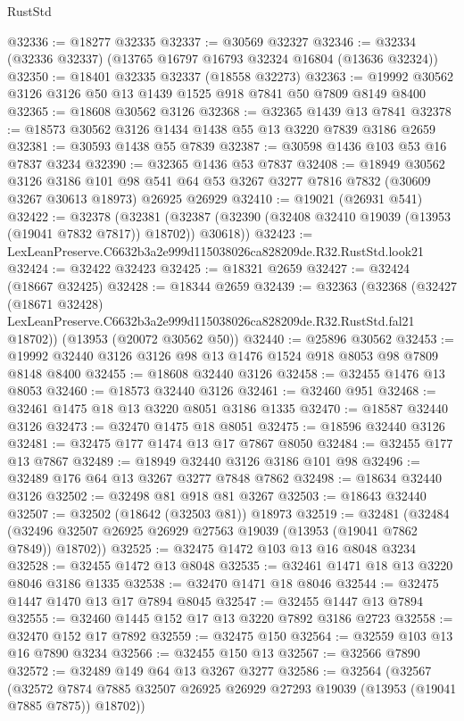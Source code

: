 \begin{lexlean}{RustStd}
\begin{coremodule}
@32336 := @18277 @32335
@32337 := @30569 @32327
@32346 := @32334 (@32336 @32337) (@13765 @16797 @16793 @32324 @16804 (@13636 @32324))
@32350 := @18401 @32335 @32337 (@18558 @32273)
@32363 := @19992 @30562 @3126 @3126 @50 @13 @1439 @1525 @918 @7841 @50 @7809 @8149 @8400
@32365 := @18608 @30562 @3126
@32368 := @32365 @1439 @13 @7841
@32378 := @18573 @30562 @3126 @1434 @1438 @55 @13 @3220 @7839 @3186 @2659
@32381 := @30593 @1438 @55 @7839
@32387 := @30598 @1436 @103 @53 @16 @7837 @3234
@32390 := @32365 @1436 @53 @7837
@32408 := @18949
    @30562
    @3126
    @3186
    @101
    @98
    @541
    @64
    @53
    @3267
    @3277
    @7816
    @7832
    (@30609 @3267 @30613 @18973)
    @26925
    @26929
@32410 := @19021 (@26931 @541)
@32422 := @32378
    (@32381 (@32387 (@32390 (@32408 @32410 @19039 (@13953 (@19041 @7832 @7817)) @18702)) @30618))
@32423 := LexLeanPreserve.C6632b3a2e999d115038026ca828209de.R32.RustStd.look21
@32424 := @32422 @32423
@32425 := @18321 @2659
@32427 := @32424 (@18667 @32425)
@32428 := @18344 @2659
@32439 := @32363
    (@32368
      (@32427
        (@18671 @32428)
        LexLeanPreserve.C6632b3a2e999d115038026ca828209de.R32.RustStd.fal21
        @18702))
    (@13953 (@20072 @30562 @50))
@32440 := @25896 @30562
@32453 := @19992 @32440 @3126 @3126 @98 @13 @1476 @1524 @918 @8053 @98 @7809 @8148 @8400
@32455 := @18608 @32440 @3126
@32458 := @32455 @1476 @13 @8053
@32460 := @18573 @32440 @3126
@32461 := @32460 @951
@32468 := @32461 @1475 @18 @13 @3220 @8051 @3186 @1335
@32470 := @18587 @32440 @3126
@32473 := @32470 @1475 @18 @8051
@32475 := @18596 @32440 @3126
@32481 := @32475 @177 @1474 @13 @17 @7867 @8050
@32484 := @32455 @177 @13 @7867
@32489 := @18949 @32440 @3126 @3186 @101 @98
@32496 := @32489 @176 @64 @13 @3267 @3277 @7848 @7862
@32498 := @18634 @32440 @3126
@32502 := @32498 @81 @918 @81 @3267
@32503 := @18643 @32440
@32507 := @32502 (@18642 (@32503 @81)) @18973
@32519 := @32481
    (@32484 (@32496 @32507 @26925 @26929 @27563 @19039 (@13953 (@19041 @7862 @7849)) @18702))
@32525 := @32475 @1472 @103 @13 @16 @8048 @3234
@32528 := @32455 @1472 @13 @8048
@32535 := @32461 @1471 @18 @13 @3220 @8046 @3186 @1335
@32538 := @32470 @1471 @18 @8046
@32544 := @32475 @1447 @1470 @13 @17 @7894 @8045
@32547 := @32455 @1447 @13 @7894
@32555 := @32460 @1445 @152 @17 @13 @3220 @7892 @3186 @2723
@32558 := @32470 @152 @17 @7892
@32559 := @32475 @150
@32564 := @32559 @103 @13 @16 @7890 @3234
@32566 := @32455 @150 @13
@32567 := @32566 @7890
@32572 := @32489 @149 @64 @13 @3267 @3277
@32586 := @32564
    (@32567
      (@32572 @7874 @7885 @32507 @26925 @26929 @27293 @19039 (@13953 (@19041 @7885 @7875)) @18702))

\end{coremodule}
\end{lexlean}
